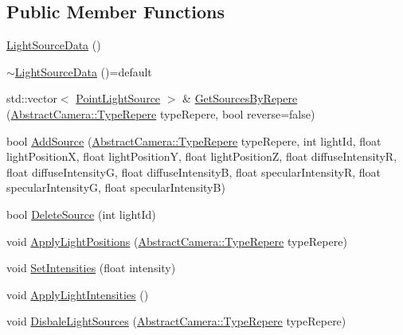 \subsection*{Public Member Functions}
\begin{DoxyCompactItemize}
\item 
\hyperlink{struct_light_source_data_a0862cd4423045f379a724594f5a7f7f2}{Light\+Source\+Data} ()
\item 
\hyperlink{struct_light_source_data_a6b7b1d0213c0aa6eccf9a521794aca9f}{$\sim$\+Light\+Source\+Data} ()=default
\item 
std\+::vector$<$ \hyperlink{struct_light_source_data_1_1_point_light_source}{Point\+Light\+Source} $>$ \& \hyperlink{struct_light_source_data_a4243a55e8ef7a65d58403bc7be09e7db}{Get\+Sources\+By\+Repere} (\hyperlink{class_abstract_camera_a4d3cc29d2eb150eada1bb387648eae98}{Abstract\+Camera\+::\+Type\+Repere} type\+Repere, bool reverse=false)
\item 
bool \hyperlink{struct_light_source_data_a575b34d80813c9057e8e4bdbc60e53c1}{Add\+Source} (\hyperlink{class_abstract_camera_a4d3cc29d2eb150eada1bb387648eae98}{Abstract\+Camera\+::\+Type\+Repere} type\+Repere, int light\+Id, float light\+PositionX, float light\+PositionY, float light\+PositionZ, float diffuse\+IntensityR, float diffuse\+IntensityG, float diffuse\+IntensityB, float specular\+IntensityR, float specular\+IntensityG, float specular\+IntensityB)
\item 
bool \hyperlink{struct_light_source_data_a586f688bed495b5e65c44a7abb3a4aa5}{Delete\+Source} (int light\+Id)
\item 
void \hyperlink{struct_light_source_data_a3e8626770e095c13a5516d98e4fe4979}{Apply\+Light\+Positions} (\hyperlink{class_abstract_camera_a4d3cc29d2eb150eada1bb387648eae98}{Abstract\+Camera\+::\+Type\+Repere} type\+Repere)
\item 
void \hyperlink{struct_light_source_data_a1a6b5906207c5db3d0b31b39df05ee2d}{Set\+Intensities} (float intensity)
\item 
void \hyperlink{struct_light_source_data_a9127f39068b76f1f68e86d8f393f5bb8}{Apply\+Light\+Intensities} ()
\item 
void \hyperlink{struct_light_source_data_a2544f01b74dd0fb023b9edbee74181f8}{Disbale\+Light\+Sources} (\hyperlink{class_abstract_camera_a4d3cc29d2eb150eada1bb387648eae98}{Abstract\+Camera\+::\+Type\+Repere} type\+Repere)
\end{DoxyCompactItemize}
